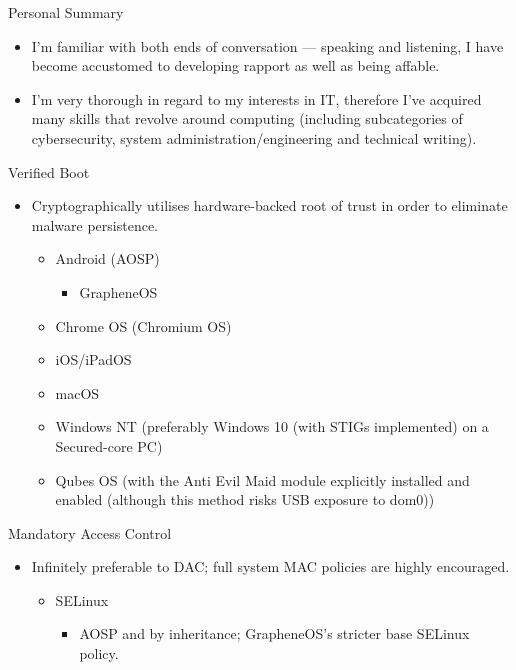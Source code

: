 \documentclass[]{mcdowellcv}
\begin{document}
	\begin{cvsection}{Personal Summary}
		\begin{cvsubsection}{}{}{}
			\begin{itemize}
				\item I'm familiar with both ends of conversation — speaking and listening, I have become accustomed to developing rapport as well as being affable.
				\item I'm very thorough in regard to my interests in IT, therefore I've acquired many skills that revolve around computing (including subcategories of cybersecurity, system administration/engineering and technical writing).
			\end{itemize}
		\end{cvsubsection}
		\begin{cvsubsection}{Verified Boot}{}{}	
			\begin{itemize}
				\item Cryptographically utilises hardware-backed root of trust in order to eliminate malware persistence.
				\begin{itemize}
					\item Android (AOSP)
					\begin{itemize}
						\item GrapheneOS
					\end{itemize}
					\item Chrome OS (Chromium OS)
					\item iOS/iPadOS
					\item macOS
					\item Windows NT (preferably Windows 10 (with STIGs implemented) on a Secured-core PC)
					\item Qubes OS (with the Anti Evil Maid module explicitly installed and enabled (although this method risks USB exposure to dom0))
				\end{itemize}
			\end{itemize}
		\end{cvsubsection}
		\begin{cvsubsection}{Mandatory Access Control}{}{}
			\begin{itemize}
				\item Infinitely preferable to DAC; full system MAC policies are highly encouraged.
				\begin{itemize}
					\item SELinux
					\begin{itemize}
						\item AOSP and by inheritance; GrapheneOS's stricter base SELinux policy.

\end{itemize}
\end{itemize}
\end{itemize}
\end{cvsubsection}
\end{cvsection}
\end{document}
